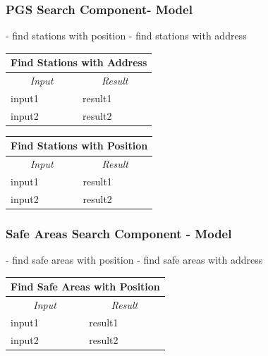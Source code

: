 \documentclass[english]{article}
\begin{document}
\subsubsection{PGS Search Component- Model}
- find stations with position
- find stations with address

\begin{center}
	\begin{tabular}{ | m{6cm} | m{6cm} | }
		\hline 
		\multicolumn{2}{|c|}{\textbf{Find Stations with Address}} \\
		\hline
		\multicolumn{1}{|c|}{\textit{Input}} & \multicolumn{1}{c|}{\textit{Result}} \\
		\hline
		input1 & result1 \\
		\hline
		input2 & result2 \\
		\hline
	\end{tabular}
\end{center}

\begin{center}
	\begin{tabular}{ | m{6cm} | m{6cm} | }
		\hline 
		\multicolumn{2}{|c|}{\textbf{Find Stations with Position}} \\
		\hline
		\multicolumn{1}{|c|}{\textit{Input}} & \multicolumn{1}{c|}{\textit{Result}} \\
		\hline
		input1 & result1 \\
		\hline
		input2 & result2 \\
		\hline
	\end{tabular}
\end{center}

\subsubsection{Safe Areas Search Component - Model}
- find safe areas with position 
- find safe areas with address

\begin{center}
	\begin{tabular}{ | m{6cm} | m{6cm} | }
		\hline 
		\multicolumn{2}{|c|}{\textbf{Find Safe Areas with Position}} \\
		\hline
		\multicolumn{1}{|c|}{\textit{Input}} & \multicolumn{1}{c|}{\textit{Result}} \\
		\hline
		input1 & result1 \\
		\hline
		input2 & result2 \\
		\hline
	\end{tabular}
\end{center}
\end{document}
